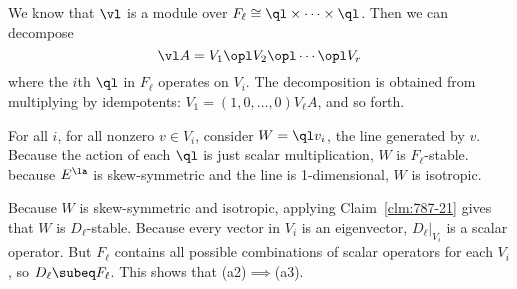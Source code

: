 We know that $\vl$ is a module over $F_{\ell}\cong \ql\times \cdots \times \ql$. Then we can decompose
\[
\vl A=V_1\opl V_2\opl\cdots \opl V_r
\]
where the $i$th $\ql$ in $F_{\ell}$ operates on $V_i$. The decomposition is obtained from multiplying by idempotents:  $V_1=(1,0,\ldots,0)V_{\ell}A$, and so forth.

For all $i$, for all nonzero $v\in V_i$, consider $W=\ql v_i$, the line generated by $v$. Because the action of each $\ql$ is just scalar multiplication, $W$ is $F_{\ell}$-stable. because $E^{\la}$ is skew-symmetric and the line is 1-dimensional, $W$ is isotropic.

Because $W$ is skew-symmetric and isotropic, applying Claim~\ref{clm:787-21} gives that $W$ is $D_{\ell}$-stable. Because every vector in $V_i$ is an eigenvector, $D_{\ell}|_{V_i}$ is a scalar operator. But $F_{\ell}$ contains all possible combinations of scalar operators for each $V_i$, so $D_{\ell}\subeq F_{\ell}$. This shows that (a2)$\implies$(a3). %

